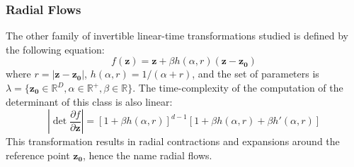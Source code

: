 \subsubsection*{Radial Flows}
The other family of invertible linear-time transformations studied is defined by the following equation:
\[f(\mathbf{z}) = \mathbf{z} + \beta h(\alpha,r)(\mathbf{z}-\mathbf{z_0}) \]
where $r=\left| \mathbf{z}-\mathbf{z_0}\right|$, $h(\alpha,r) = 1/(\alpha+r)$, and the set of parameters is $\lambda = \{ \mathbf{z_0}\in \mathbb{R}^D, \alpha \in \mathbb{R} ^{+}, \beta \in \mathbb{R} \}$. The time-complexity of the computation of the determinant of this class is also linear:
\[ \left| \det \frac{\partial f}{\partial \mathbf{z}} \right| = [1+\beta h(\alpha ,r)]^{d-1}[1+\beta h(\alpha ,r)+\beta h'(\alpha ,r)] \] %
This transformation results in radial contractions and expansions around the reference point $\mathbf{z_0}$, hence the name radial flows.


